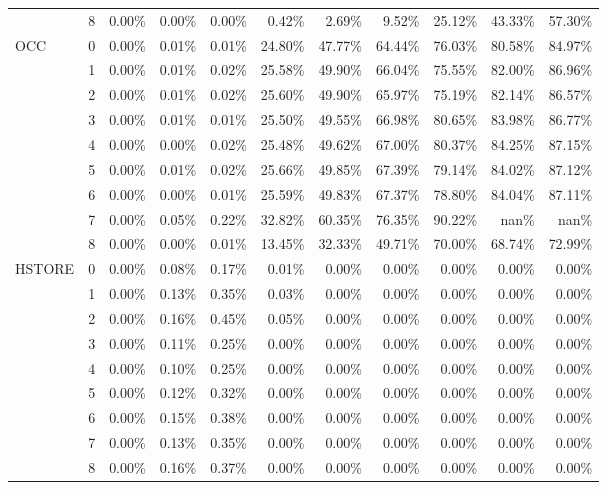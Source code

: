 \begin{tabular}{llrrrrrrrrr}
       & 8 & 0.00\% & 0.00\% & 0.00\% &  0.42\% &  2.69\% &  9.52\% & 25.12\% & 43.33\% & 57.30\% \\
OCC & 0 & 0.00\% & 0.01\% & 0.01\% & 24.80\% & 47.77\% & 64.44\% & 76.03\% & 80.58\% & 84.97\% \\
       & 1 & 0.00\% & 0.01\% & 0.02\% & 25.58\% & 49.90\% & 66.04\% & 75.55\% & 82.00\% & 86.96\% \\
       & 2 & 0.00\% & 0.01\% & 0.02\% & 25.60\% & 49.90\% & 65.97\% & 75.19\% & 82.14\% & 86.57\% \\
       & 3 & 0.00\% & 0.01\% & 0.01\% & 25.50\% & 49.55\% & 66.98\% & 80.65\% & 83.98\% & 86.77\% \\
       & 4 & 0.00\% & 0.00\% & 0.02\% & 25.48\% & 49.62\% & 67.00\% & 80.37\% & 84.25\% & 87.15\% \\
       & 5 & 0.00\% & 0.01\% & 0.02\% & 25.66\% & 49.85\% & 67.39\% & 79.14\% & 84.02\% & 87.12\% \\
       & 6 & 0.00\% & 0.00\% & 0.01\% & 25.59\% & 49.83\% & 67.37\% & 78.80\% & 84.04\% & 87.11\% \\
       & 7 & 0.00\% & 0.05\% & 0.22\% & 32.82\% & 60.35\% & 76.35\% & 90.22\% &   nan\% &   nan\% \\
       & 8 & 0.00\% & 0.00\% & 0.01\% & 13.45\% & 32.33\% & 49.71\% & 70.00\% & 68.74\% & 72.99\% \\
HSTORE & 0 & 0.00\% & 0.08\% & 0.17\% &  0.01\% &  0.00\% &  0.00\% &  0.00\% &  0.00\% &  0.00\% \\
       & 1 & 0.00\% & 0.13\% & 0.35\% &  0.03\% &  0.00\% &  0.00\% &  0.00\% &  0.00\% &  0.00\% \\
       & 2 & 0.00\% & 0.16\% & 0.45\% &  0.05\% &  0.00\% &  0.00\% &  0.00\% &  0.00\% &  0.00\% \\
       & 3 & 0.00\% & 0.11\% & 0.25\% &  0.00\% &  0.00\% &  0.00\% &  0.00\% &  0.00\% &  0.00\% \\
       & 4 & 0.00\% & 0.10\% & 0.25\% &  0.00\% &  0.00\% &  0.00\% &  0.00\% &  0.00\% &  0.00\% \\
       & 5 & 0.00\% & 0.12\% & 0.32\% &  0.00\% &  0.00\% &  0.00\% &  0.00\% &  0.00\% &  0.00\% \\
       & 6 & 0.00\% & 0.15\% & 0.38\% &  0.00\% &  0.00\% &  0.00\% &  0.00\% &  0.00\% &  0.00\% \\
       & 7 & 0.00\% & 0.13\% & 0.35\% &  0.00\% &  0.00\% &  0.00\% &  0.00\% &  0.00\% &  0.00\% \\
       & 8 & 0.00\% & 0.16\% & 0.37\% &  0.00\% &  0.00\% &  0.00\% &  0.00\% &  0.00\% &  0.00\% \\

\end{tabular}
